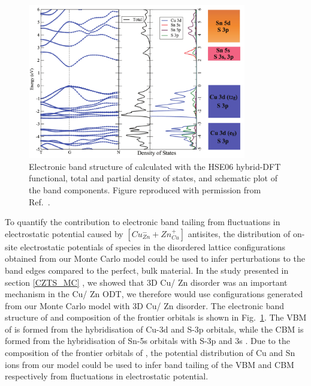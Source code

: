 \documentclass[11pt, twoside]{report}
\begin{document}
\begin{figure}[h!]
  \centering
    \includegraphics[width=0.85\textwidth]{figures/CZTS_band_structure.png}
    \caption[Electronic band structure of {\CZTS} calculated with the HSE06 hybrid-DFT functional, total and partial density of states, and schematic plot of the band components.]{Electronic band structure of {\CZTS} calculated with the HSE06 hybrid-DFT functional, total and partial density of states, and schematic plot of the band components. Figure reproduced with permission from Ref.~.}
  \label{CZTS_band_structure}
\end{figure}

To quantify the contribution to electronic band tailing from fluctuations in electrostatic potential caused by $[Cu_{Zn}^{-} + Zn_{Cu}^{+}]$ antisites, the distribution of on-site electrostatic potentials of species in the disordered lattice configurations obtained from our Monte Carlo model could be used to infer perturbations to the band edges compared to the perfect, bulk material. In the study presented in section \ref{CZTS_MC} \cite{eris_paper}, we showed that 3D Cu/ Zn disorder was an important mechanism in the Cu/ Zn ODT, we therefore would use configurations generated from our Monte Carlo model with 3D Cu/ Zn disorder. The electronic band structure of {\CZTS} and composition of the frontier orbitals is shown in Fig.~\ref{CZTS_band_structure}. 
The VBM of {\CZTS} is formed from the hybridisation of Cu-3d and S-3p orbitals, while the CBM is formed from the hybridisation of Sn-5s orbitals with S-3p and 3s \cite{defects_Chen_large}. Due to the composition of the frontier orbitals of {\CZTS}, the potential distribution of Cu and Sn ions from our model could be used to infer band tailing of the VBM and CBM respectively from fluctuations in electrostatic potential.
\end{document}
